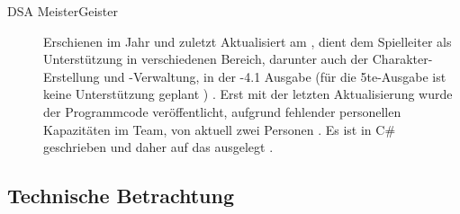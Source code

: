 \begin{description}
    \item[DSA MeisterGeister] Erschienen im Jahr  und zuletzt Aktualisiert am , dient dem Spielleiter als Unterstützung in verschiedenen Bereich, darunter auch der Charakter-Erstellung und -Verwaltung, in der -4.1 Ausgabe (für die 5te-Ausgabe ist keine Unterstützung geplant ) .
    Erst mit der letzten Aktualisierung wurde der Programmcode veröffentlicht, aufgrund fehlender personellen Kapazitäten im Team, von aktuell zwei Personen .
    Es ist in C\# geschrieben und daher auf das   ausgelegt .
\end{description}


\subsection{Technische Betrachtung}
\label{subsec:technische-betrachtung}

